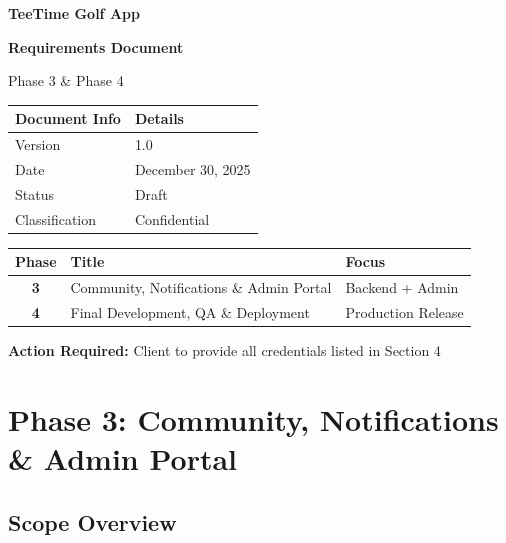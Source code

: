 \documentclass[11pt,a4paper]{article}
\begin{document}
\begin{titlepage}
\centering
\vspace*{1cm}
{\Huge\bfseries\color{primary} TeeTime Golf App\par}
\vspace{0.5cm}
{\LARGE\bfseries Requirements Document\par}
\vspace{0.3cm}
{\Large Phase 3 \& Phase 4\par}
\vspace{1.5cm}

\begin{tabular}{|l|l|}
\hline
\rowcolor{lightgray}
\textbf{Document Info} & \textbf{Details} \\
\hline
Version & 1.0 \\
Date & December 30, 2025 \\
Status & Draft \\
Classification & Confidential \\
\hline
\end{tabular}

\vspace{1.5cm}

\begin{tabular}{|c|l|l|}
\hline
\rowcolor{lightgray}
\textbf{Phase} & \textbf{Title} & \textbf{Focus} \\
\hline
\cellcolor{phase3!20}\textbf{3} & Community, Notifications \& Admin Portal & Backend + Admin \\
\hline
\cellcolor{phase4!20}\textbf{4} & Final Development, QA \& Deployment & Production Release \\
\hline
\end{tabular}

\vfill
{\large\textbf{Action Required:} Client to provide all credentials listed in Section 4\par}
\end{titlepage}

\tableofcontents
\newpage


\section{Phase 3: Community, Notifications \& Admin Portal}

\subsection{Scope Overview}
\end{document}
